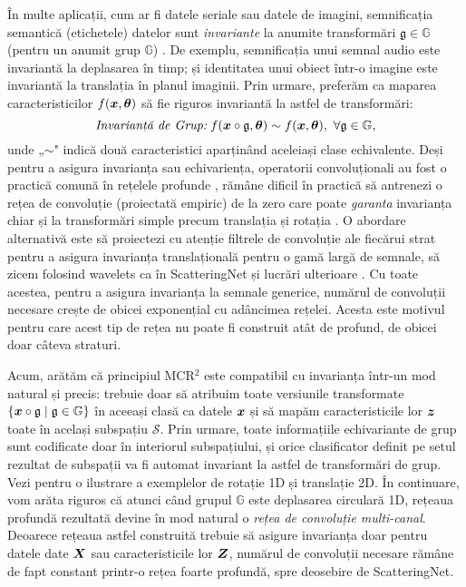\documentclass[../../book-main_ro.tex]{subfiles}
\begin{document}
În multe aplicații, cum ar fi datele seriale sau datele de imagini, semnificația semantică (etichetele) datelor sunt {\em invariante} la anumite transformări $\mathfrak{g} \in \mathbb{G}$ (pentru un anumit grup $\mathbb{G}$) \cite{CohenW16,deep-sets-NIPS2017}. De exemplu, semnificația unui semnal audio este invariantă la deplasarea în timp; și identitatea unui obiect într-o imagine este invariantă la translația în planul imaginii. Prin urmare, preferăm ca maparea caracteristicilor $f(\bm{x},\bm \theta)$ să fie riguros invariantă la astfel de transformări:
\begin{equation}
\mbox{\em Invarianță de Grup:}\;   f(\bm{x}\circ \mathfrak{g}, \bm \theta) \sim f(\bm{x},\bm \theta),\ \forall \mathfrak{g} \in \mathbb{G},
\end{equation}
unde „$\sim$" indică două caracteristici aparținând aceleiași clase echivalente. Deși pentru a asigura invarianța sau echivariența, operatorii convoluționali au fost o practică comună în rețelele profunde \cite{CohenW16}, rămâne dificil în practică să antrenezi o rețea de convoluție (proiectată empiric) de la zero care poate {\em garanta} invarianța chiar și la transformări simple precum translația și rotația \cite{azulay2018deep,engstrom2017rotation}. O abordare alternativă este să proiectezi cu atenție filtrele de convoluție ale fiecărui strat pentru a asigura invarianța translațională pentru o gamă largă de semnale, să zicem folosind wavelets ca în ScatteringNet \cite{scattering-net} și lucrări ulterioare \cite{Wiatowski-2018}. Cu toate acestea, pentru a asigura invarianța la semnale generice, numărul de convoluții necesare crește de obicei exponențial cu adâncimea rețelei. Acesta este motivul pentru care acest tip de rețea nu poate fi construit atât de profund, de obicei doar câteva straturi. 

Acum, arătăm că principiul MCR$^2$ este compatibil cu invarianța într-un mod natural și precis: trebuie doar să atribuim toate versiunile transformate $\{\bm{x}\circ \mathfrak{g} \mid \mathfrak{g} \in \mathbb G\}$ în aceeași clasă ca datele $\bm{x}$ și să mapăm caracteristicile lor $\bm{z}$ toate în același subspațiu $\mathcal S$. Prin urmare, toate informațiile echivariante de grup sunt codificate doar în interiorul subspațiului, și orice clasificator definit pe setul rezultat de subspații va fi automat invariant la astfel de transformări de grup. Vezi  pentru o ilustrare a exemplelor de rotație 1D și translație 2D. În continuare, vom arăta riguros că atunci când grupul $\mathbb G$ este deplasarea circulară 1D, rețeaua profundă rezultată devine în mod natural o {\em rețea de convoluție multi-canal}. 
Deoarece rețeaua astfel construită trebuie să asigure invarianța doar pentru datele date $\bm{X}$ sau caracteristicile lor $\bm{Z}$, numărul de convoluții necesare rămâne de fapt constant printr-o rețea foarte profundă, spre deosebire de ScatteringNet. 
\end{document}
